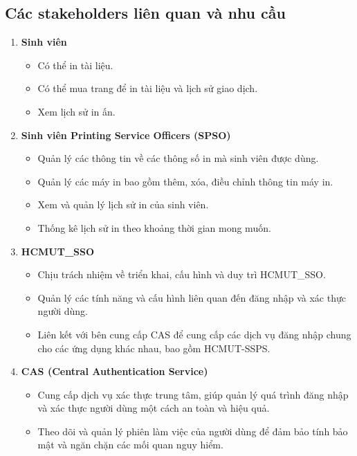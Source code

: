 \documentclass[a4paper]{article}
\begin{document}
    \subsection{Các stakeholders liên quan và nhu cầu}
    \begin{enumerate}
        \item {\textbf{Sinh viên}}
             \begin{itemize}
                 \item Có thể in tài liệu.
                 \item Có thể mua trang để in tài liệu và lịch sử giao dịch.
                 \item Xem lịch sử in ấn.
             \end{itemize}
        \item {\textbf{Sinh viên Printing Service Officers (SPSO)}}
             \begin{itemize}
             \item Quản lý các thông tin về các thông số in mà sinh viên được dùng.
                 \item Quản lý các máy in bao gồm thêm, xóa, điều chỉnh thông tin máy in.
                 \item Xem và quản lý lịch sử in của sinh viên.
                 \item Thống kê lịch sử in theo khoảng thời gian mong muốn.
             \end{itemize}
        \item {\textbf{HCMUT\_SSO}}
             \begin{itemize}
                \item Chịu trách nhiệm về triển khai, cấu hình và duy trì HCMUT\_SSO.
                \item Quản lý các tính năng và cấu hình liên quan đến đăng nhập và xác thực người dùng.
                \item Liên kết với bên cung cấp CAS để cung cấp các dịch vụ đăng nhập chung cho các ứng dụng khác nhau, bao gồm HCMUT-SSPS.
             \end{itemize}
             \item {\textbf{CAS (Central Authentication Service)}}
             \begin{itemize}
                \item Cung cấp dịch vụ xác thực trung tâm, giúp quản lý quá trình đăng nhập và xác thực người dùng một cách an toàn và hiệu quả.
                \item Theo dõi và quản lý phiên làm việc của người dùng để đảm bảo tính bảo mật và ngăn chặn các mối quan nguy hiểm.

\end{itemize}
\end{enumerate}
\end{document}
